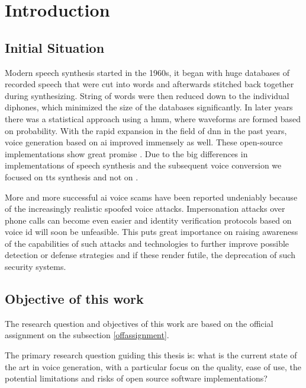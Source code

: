 \newpage
\section{Introduction}

\subsection{Initial Situation}

Modern speech synthesis started in the 1960s, it began with huge databases of recorded speech that were cut into words and afterwards stitched back together during synthesizing. String of words were then reduced down to the individual diphones, which minimized the size of the databases significantly. In later years there was a statistical approach using a \gls{hmm}, where waveforms are formed based on probability. With the rapid expansion in the field of \gls{dnn} in the past years, voice generation based on \gls{ai} improved immensely as well.
These open-source implementations show great promise 
.
Due to the big differences in implementations of speech synthesis and the subsequent voice conversion we focused on \gls{tts} synthesis and not on
.

More and more successful \gls{ai} voice scams have been reported %
undeniably because of the increasingly realistic spoofed voice attacks. %
Impersonation attacks over phone calls can become even easier and identity verification protocols based on voice id will soon be unfeasible. This puts great importance on raising awareness of the capabilities of such attacks and technologies to further improve possible detection or defense strategies and if these render futile, the deprecation of such security systems.


\subsection{Objective of this work}
The research question and objectives of this work are based on the official assignment on the subsection \ref{offassignment}.

The primary research question guiding this thesis is:
what is the current state of the art in voice generation, with a particular focus on the quality, ease of use, the potential limitations and risks of open source software implementations? 

